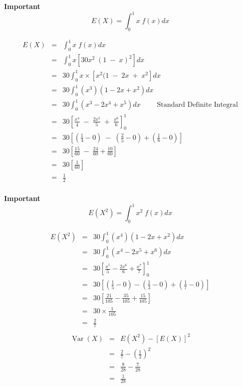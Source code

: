 \documentclass[a4paper,30pt]{article}
\begin{document}
{
\large
\begin{framed}
\noindent \textbf{Important}
\[E(X) = \int^{1}_{0} x \;f(x) dx \]
\end{framed}
\begin{eqnarray*}
E(X) &=& \int^{1}_{0} x \;f(x) dx \\
&=& \int^{1}_{0} x[30x^2 \; (1\;-\;x)^2] dx \\
&=& 30 \int^{1}_{0} x  \times \left[ x^2 (1 \;-\; 2x \;+\; x^2\right] dx\\
&=& 30 \int^{1}_{0} (x^3)(1-2x + x^2) dx\\
&=& 30 \int^{1}_{0} (x^3 -2x^4 + x^5) dx \qquad { \mbox{ Standard Definite Integral}} \\
&=& 30 \left[ \frac{x^4}{4}  \;-\;  \frac{2x^5}{5} \; + \; \frac{x^6}{6}  \right]^{1}_{0}\\
&=& 30 \left[ \left( \frac{1}{4}- 0 \right) \;-\; \left( \frac{2}{5}- 0 \right) + \left( \frac{1}{6}- 0 \right) \right]\\
&=& 30 \left[  \frac{15}{60} \;-\;  \frac{24}{60} +  \frac{10}{60} \right]\\
&=& 30 \left[  \frac{1}{60}  \right]\\
&=&  \frac{1}{2}\\
\end{eqnarray*}
}
\newpage
\begin{framed}
\large
\noindent \textbf{Important}
\[E(X^2) = \int^{1}_{0} x^2 \;f(x) dx \]
\end{framed}
\large
\begin{eqnarray*}
E(X^2) 
&=& 30 \int^{1}_{0} (x^4)(1-2x + x^2) dx\\
&=& 30 \int^{1}_{0} (x^4 -2x^5 + x^6) dx\\
&=& 30 \left[  \frac{x^5}{5} - \frac{2x^6}{6} + \frac{x^7}{7}\right]^{1}_{0}\\
&=& 30 \left[  \left(\frac{1}{5} - 0\right)  -  \left(\frac{1}{3} - 0\right) +  \left(\frac{1}{7} - 0\right) \right]\\
&=& 30 \left[  \frac{21}{105} - \frac{35}{105} + \frac{15}{105}\right]\\
&=& 30 \times \frac{1}{105} \\
&=&  \frac{2}{7} \\
\end{eqnarray*}
\large
\begin{eqnarray*}
\operatorname{Var}(X) &=& E(X^2) - [E(X)]^2 \\
 &=& \frac{2}{7} - \left(\frac{1}{2}\right)^2 \\
 &=& \frac{8}{28} - \frac{7}{28} \\
 &=& \frac{1}{28} \\
\end{eqnarray*}
\end{document}
